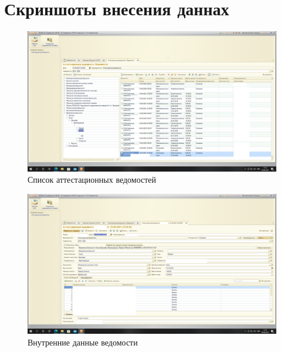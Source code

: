 \documentclass[12pt,a4paper]{scrartcl}
\begin{document}
\section{Скриншоты внесения даннах}
\label{sec:picexample}

\begin{figure}[h]
	\centering
	\includegraphics[width=0.8 \textwidth]{изображение_2022-06-09_120233979.png}
	\caption{Список аттестационных ведомостей}\label{fig:par}
\end{figure}

\begin{figure}[h]
	\centering
	\includegraphics[width=0.8 \textwidth]{изображение_2022-06-09_120209857.png}
	\caption{Внутренние данные ведомости}\label{fig:par}
\end{figure}
\end{document}
